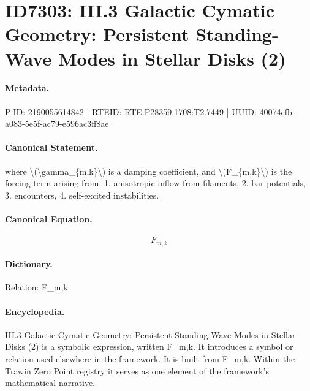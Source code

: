 \section*{ID7303: III.3 Galactic Cymatic Geometry: Persistent Standing-Wave Modes in Stellar Disks (2)}
\paragraph{Metadata.}
PiID: 2190055614842 | RTEID: RTE:P28359.1708:T2.7449 | UUID: 40074cfb-a083-5e5f-ac79-e596ac3ff8ae

\paragraph{Canonical Statement.}
where \textbackslash{}(\textbackslash{}gamma\_\{m,k\}\textbackslash{}) is a damping coefficient, and \textbackslash{}(F\_\{m,k\}\textbackslash{}) is the forcing term arising from: 1. anisotropic inflow from filaments, 2. bar potentials, 3. encounters, 4. self-excited instabilities.

\paragraph{Canonical Equation.}
\[
F_{m,k}
\]

\paragraph{Dictionary.}
Relation: F\_m,k

\paragraph{Encyclopedia.}
III.3 Galactic Cymatic Geometry: Persistent Standing-Wave Modes in Stellar Disks (2) is a symbolic expression, written F\_m,k. It introduces a symbol or relation used elsewhere in the framework. It is built from F\_m,k. Within the Trawin Zero Point registry it serves as one element of the framework's mathematical narrative.
